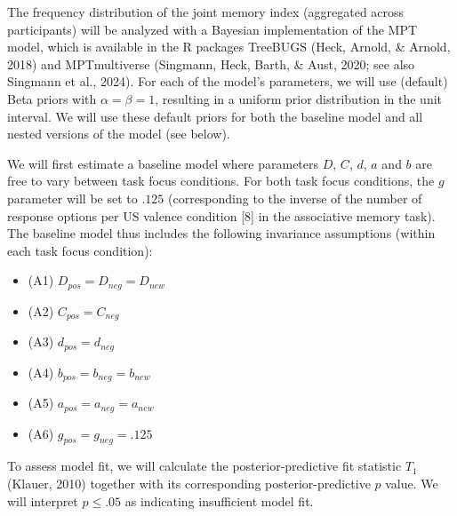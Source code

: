\documentclass[
  doc,floatsintext]{apa6}
\begin{document}
The frequency distribution of the joint memory index (aggregated across participants) will be analyzed with
a Bayesian implementation of the MPT model, which is available in the R packages TreeBUGS (Heck, Arnold, \& Arnold, 2018) and MPTmultiverse (Singmann, Heck, Barth, \& Aust, 2020; see also Singmann et al., 2024).
For each of the model's parameters, we will use (default) Beta priors with \(\alpha = \beta = 1\),
resulting in a uniform prior distribution in the unit interval.
We will use these default priors for both the baseline model and all nested versions of the model (see below).

We will first estimate a baseline model where parameters \(D\), \(C\), \(d\), \(a\) and \(b\) are free to vary between task focus conditions.
For both task focus conditions, the \(g\) parameter will be set to \(.125\) (corresponding to the inverse of the number of response options per US valence condition {[}8{]} in the associative memory task).
The baseline model thus includes the following invariance assumptions (within each task focus condition):

\begin{itemize}
\item
  (A1) \(D_\textit{pos}=D_\textit{neg}=D_\textit{new}\)
\item
  (A2) \(C_\textit{pos}=C_\textit{neg}\)
\item
  (A3) \(d_\textit{pos}=d_\textit{neg}\)
\item
  (A4) \(b_\textit{pos}=b_\textit{neg}=b_\textit{new}\)
\item
  (A5) \(a_\textit{pos}=a_\textit{neg}=a_\textit{new}\)
\item
  (A6) \(g_\textit{pos}=g_\textit{neg}=.125\)
\end{itemize}

To assess model fit, we will calculate the posterior-predictive fit statistic \(T_1\) (Klauer, 2010) together with its corresponding posterior-predictive \(p\) value.
We will interpret \(p \leq. 05\) as indicating insufficient model fit.
\end{document}
